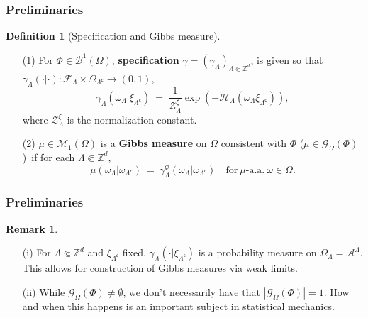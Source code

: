 \documentclass{beamer}
\newcommand{\A}{\mathcal{A}}
\newcommand{\BB}{\mathscr{B}}
\renewcommand{\c}{\mathsf{c}}
\newcommand{\F}{\mathcal{F}}
\newcommand{\G}{\mathcal{G}}
\renewcommand{\H}{\mathcal{H}}
\newcommand{\M}{\mathcal{M}}
\newcommand{\Z}{\mathbb{Z}}
\newcommand{\ZZ}{\mathcal{Z}}
\newcommand{\ra}{\rightarrow}
\newcommand{\pika}{\boldsymbol{\cdot}}
\newcommand{\1}{\mathbbm{1}}
\renewcommand{\c}{\mathsf{c}}
\newcommand{\5}{\vspace{0.5cm}}
\newcommand{\3}{\vspace{0.3cm}}
\theoremstyle{definition}
\newtheorem{df}[thm]{Definition}
\newtheorem{rem}[thm]{Remark}
\begin{document}
\begin{frame}
\frametitle{Preliminaries}
\begin{df}[Specification and Gibbs measure]
\begin{itemize}
	\item[(1)] For $\Phi\in\BB^1(\Omega)$, \textbf{specification} $\gamma=(\gamma_\Lambda)_{\Lambda\Subset\Z^d}$, is given so that $\gamma_\Lambda(\pika|\pika):\F_\Lambda\times\Omega_{\Lambda^\c}\ra(0,1)$,\pause
	$$\gamma_\Lambda(\omega_\Lambda|\xi_{\Lambda^\c}) ~=~ \frac{1}{\ZZ_\Lambda^\xi}\exp(-\H_\Lambda(\omega_\Lambda\xi_{\Lambda^\c})),$$
	where $\ZZ_\Lambda^\xi$ is the normalization constant.\pause
	\item[(2)] $\mu\in\M_1(\Omega)$ is a \textbf{Gibbs measure} on $\Omega$ consistent with $\Phi$ ($\mu\in\G_\Omega(\Phi)$)\pause~if for each $\Lambda\Subset\Z^d$,
	$$\mu(\omega_\Lambda|\omega_{\Lambda^\c}) ~=~ \gamma_\Lambda^\Phi(\omega_\Lambda|\omega_{\Lambda^\c}) \quad \text{for}~\mu\text{-a.a.}~\omega\in\Omega.$$
\end{itemize}
\end{df}
\end{frame}

\begin{frame}
\frametitle{Preliminaries}
\begin{rem}
\begin{itemize}
	\item[(i)] For $\Lambda\Subset\Z^d$ and $\xi_{\Lambda^\c}$ fixed, $\gamma_{\Lambda}(\pika|\xi_{\Lambda^\c})$ is a probability measure on $\Omega_\Lambda=\A^\Lambda$. This allows for construction of Gibbs measures via weak limits.\pause
	\item[(ii)] While $\G_{\Omega}(\Phi)\neq \emptyset$, we don't necessarily have that $|\G_{\Omega}(\Phi)|=1$. How and when this happens is an important subject in statistical mechanics.
\end{itemize}
\end{rem}
\end{frame}

\end{document}
